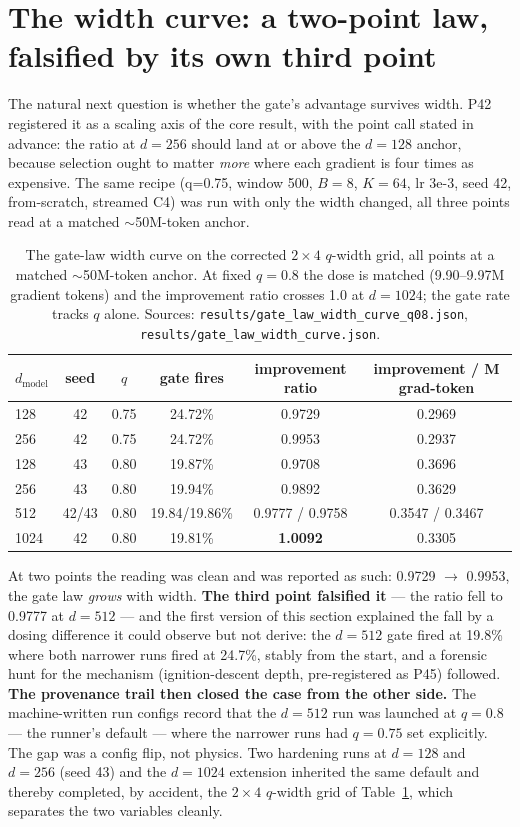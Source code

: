 \documentclass[11pt]{article}
\theoremstyle{definition}
\newcommand{\code}[1]{\texttt{#1}}
\begin{document}
\section{The width curve: a two-point law, falsified by its own third point}
\label{sec:width}

The natural next question is whether the gate's advantage survives width.
P42 registered it as a scaling axis of the core result, with the point call
stated in advance: the ratio at $d{=}256$ should land at or above the
$d{=}128$ anchor, because selection ought to matter \emph{more} where each
gradient is four times as expensive. The same recipe (q=0.75, window 500,
$B{=}8$, $K{=}64$, lr 3e-3, seed 42, from-scratch, streamed C4) was run with
only the width changed, all three points read at a matched $\sim$50M-token
anchor.

\begin{table}[tb]
\centering
\caption{The gate-law width curve on the corrected $2\times4$ $q$-width
grid, all points at a matched $\sim$50M-token anchor. At fixed $q{=}0.8$
the dose is matched (9.90--9.97M gradient tokens) and the improvement
ratio crosses 1.0 at $d{=}1024$; the gate rate tracks $q$ alone. Sources:
\code{results/gate\_law\_width\_curve\_q08.json},
\code{results/gate\_law\_width\_curve.json}.}
\label{tab:width}
\begin{tabular}{@{}lccccc@{}}
\toprule
$d_\text{model}$ & seed & $q$ & gate fires & improvement ratio
& improvement / M grad-token\\
\midrule
128 & 42 & 0.75 & 24.72\% & 0.9729 & 0.2969\\
256 & 42 & 0.75 & 24.72\% & 0.9953 & 0.2937\\
128 & 43 & 0.80 & 19.87\% & 0.9708 & 0.3696\\
256 & 43 & 0.80 & 19.94\% & 0.9892 & 0.3629\\
512 & 42/43 & 0.80 & 19.84/19.86\% & 0.9777 / 0.9758 & 0.3547 / 0.3467\\
1024 & 42 & 0.80 & 19.81\% & \textbf{1.0092} & 0.3305\\
\bottomrule
\end{tabular}
\end{table}

At two points the reading was clean and was reported as such: 0.9729 $\to$
0.9953, the gate law \emph{grows} with width. \textbf{The third point
falsified it} --- the ratio fell to 0.9777 at $d{=}512$ --- and the first
version of this section explained the fall by a dosing difference it could
observe but not derive: the $d{=}512$ gate fired at 19.8\% where both
narrower runs fired at 24.7\%, stably from the start, and a forensic hunt
for the mechanism (ignition-descent depth, pre-registered as P45)
followed. \textbf{The provenance trail then closed the case from the other
side.} The machine-written run configs record that the $d{=}512$ run was
launched at $q{=}0.8$ --- the runner's default --- where the narrower runs
had $q{=}0.75$ set explicitly. The gap was a config flip, not physics.
Two hardening runs at $d{=}128$ and $d{=}256$ (seed 43) and the
$d{=}1024$ extension inherited the same default and thereby completed, by
accident, the $2\times4$ $q$-width grid of Table~\ref{tab:width}, which
separates the two variables cleanly.
\end{document}
